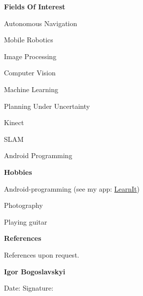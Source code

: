 \documentclass[a4paper,12pt,final]{memoir}
\newcommand{\Sep}{\vspace{1.5em}}
\newcommand{\SmallSep}{\vspace{0.5em}}
\newcommand{\CVSection}[1]
	{\Large\textbf{#1}\par
	\SmallSep\normalsize\normalfont}
\begin{document}
\CVSection{Fields Of Interest}
\begin{compactitem}[\color{MidnightBlue}$\circ$]
	\item Autonomous Navigation
	\item Mobile Robotics
	\item Image Processing
	\item Computer Vision
	\item Machine Learning
	\item Planning Under Uncertainty
	\item Kinect
	\item SLAM
	\item Android Programming
\end{compactitem}
\SmallSep

\CVSection{Hobbies}
\begin{compactitem}[\color{MidnightBlue}$\circ$]
	\item Android-programming (see my app: \href{https://github.com/niosus/LearnIt}{LearnIt})
	\item Photography
	\item Playing guitar
\end{compactitem}
\SmallSep
\CVSection{References}
References upon request.
\Sep

\CVSection{\hspace{60mm}Igor Bogoslavskyi}
\vspace{3mm}
Date: \hspace{28mm} Signature:
\clearpage
\framebreak

\end{document}
